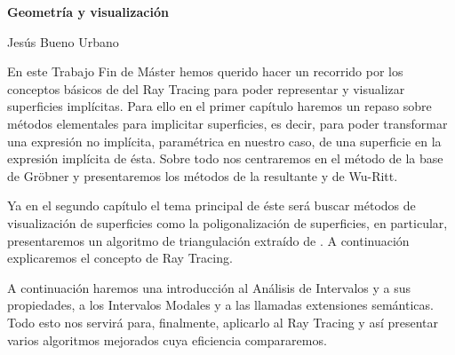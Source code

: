 

%



\cleardoublepage
\thispagestyle{empty}

\begin{center}
{\large\bfseries Geometría y visualización}\\
\end{center}
\begin{center}
Jesús Bueno Urbano\\
\end{center}


\vspace{0.7cm}

En este Trabajo Fin de Máster hemos querido hacer un recorrido por los conceptos básicos de del Ray Tracing para poder representar y visualizar superficies implícitas. Para ello en el  primer capítulo haremos un repaso sobre métodos elementales para implicitar superficies, es decir, para poder transformar una expresión no implícita, paramétrica en nuestro caso, de una superficie en la expresión implícita de ésta. Sobre todo nos centraremos en el método de la base de Gröbner y presentaremos los métodos de la resultante y de Wu-Ritt.

Ya en el segundo capítulo el tema principal de éste será buscar métodos de visualización de superficies como la poligonalización de superficies, en particular, presentaremos un algoritmo de triangulación extraído de \cite{Hartmann03}. A continuación explicaremos el concepto de Ray Tracing.

A continuación haremos una introducción al Análisis de Intervalos y a sus propiedades, a los Intervalos Modales y a las llamadas extensiones semánticas. Todo esto nos servirá para, finalmente, aplicarlo al Ray Tracing y así presentar varios algoritmos mejorados cuya eficiencia compararemos.
\cleardoublepage





